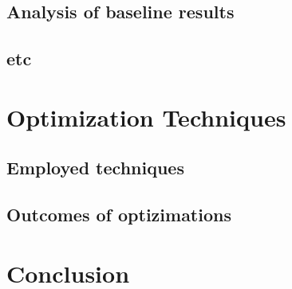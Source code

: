 \subsection{Analysis of baseline results}

\subsection{etc}


\section{Optimization Techniques}
\subsection{Employed techniques}

\subsection{Outcomes of optizimations}



\newpage
\section{Conclusion}

